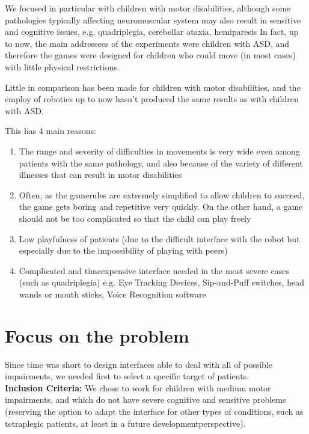 \documentclass[a4paper,twoside]{book}
\begin{document}
We focused in particular with children with motor disabilities, although some pathologies typically affecting neuromuscular system may also result in sensitive and cognitive issues, e.g. quadriplegia, cerebellar ataxia, hemiparesis \textellipsis
In fact, up to now, the main addressees of the experiments were children with ASD, and therefore the games were designed for children who could move (in most cases) with little physical restrictions.

Little in comparison has been made for children with motor disabilities, and the employ of robotics up to now hasn't produced the same results as with children with ASD.

This has 4 main reasons:

\begin{enumerate}
\item The range and severity of difficulties in movements is very wide even among patients with the same pathology, and also because of the variety of different illnesses that can result in motor disabilities
\item Often, as the game\textendash rules are extremely simplified to allow children to succeed, the game gets boring and repetitive very quickly. On the other hand, a game should not be too complicated so that the child can play freely
\item Low playfulness of patients (due to the difficult interface with the robot but especially due to the impossibility of playing with peers)
\item Complicated and time\textendash expensive interface needed in the most severe cases (such as quadriplegia) e.g. Eye Tracking Devices, Sip-and-Puff switches, head wands or mouth sticks, Voice Recognition software \textellipsis
\end{enumerate}

\section{Focus on the problem}

Since time was short to design interfaces able to deal with all of possible impairments, we needed first to select a specific target of patients.
\\

\textbf{Inclusion Criteria:} We chose to work for children with medium motor impairments, and which do not have severe cognitive and sensitive problems (reserving the option to adapt the interface for other types of conditions, such as tetraplegic patients, at least in a future development\textendash perspective).
\\
\end{document}

